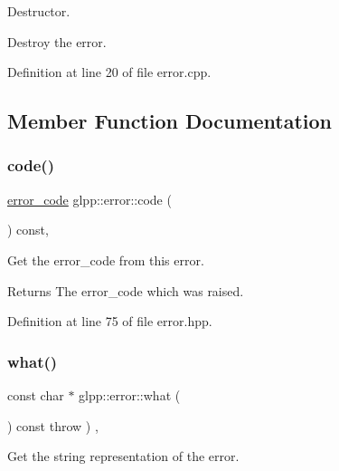 Destructor. 

Destroy the error. 

Definition at line 20 of file error.\+cpp.



\subsection{Member Function Documentation}
\mbox{\label{classglpp_1_1error_a36c978058800d46310de3638be3f1ca6}} 
\subsubsection{\texorpdfstring{code()}{code()}}
{\footnotesize\ttfamily \hyperlink{namespaceglpp_a1fe5e1dcc793337b3958e3cd2352432c}{error\+\_\+code} glpp\+::error\+::code (\begin{DoxyParamCaption}{ }\end{DoxyParamCaption}) const\hspace{0.3cm}{\ttfamily [inline]}, {\ttfamily [noexcept]}}



Get the error\+\_\+code from this error. 

\begin{DoxyReturn}{Returns}
The error\+\_\+code which was raised. 
\end{DoxyReturn}


Definition at line 75 of file error.\+hpp.

\mbox{\label{classglpp_1_1error_aa8a4425f1cc890c40a9992fe883cf3bc}} 
\subsubsection{\texorpdfstring{what()}{what()}}
{\footnotesize\ttfamily const char $\ast$ glpp\+::error\+::what (\begin{DoxyParamCaption}{ }\end{DoxyParamCaption}) const throw  ) \hspace{0.3cm}{\ttfamily [override]}, {\ttfamily [virtual]}}



Get the string representation of the error. 

